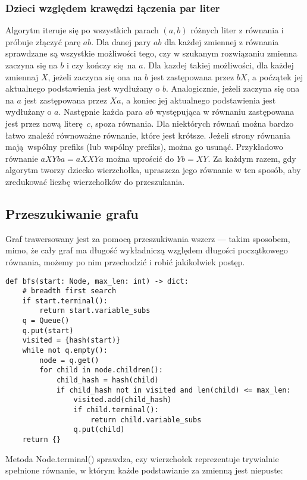 \documentclass[leqno, 12pt]{article}
\begin{document}
\subsubsection*{Dzieci względem krawędzi łączenia par liter}
Algorytm iteruje się po wszystkich parach $(a, b)$ różnych liter z równania i próbuje złączyć parę $ab$.
Dla danej pary $ab$ dla każdej zmiennej z równania sprawdzane są wszystkie możliwości tego, czy w szukanym rozwiązaniu zmienna zaczyna się na $b$ i czy kończy się na $a$. Dla kazdej takiej możliwości, dla każdej zmiennaj $X$, jeżeli zaczyna się ona na $b$ jest zastępowana przez $bX$, a poćzątek jej aktualnego podstawienia jest wydłużany o $b$. Analogicznie, jeżeli zaczyna się ona na $a$ jest zastępowana przez $Xa$, a koniec jej aktualnego podstawienia jest wydłużany o $a$. Następnie każda para $ab$ występująca w równaniu zastępowana jest przez nową literę $c$, spoza równania.
\newline\newline
Dla niektórych równań można bardzo łatwo znaleźć równoważne równanie, które jest krótsze. Jeżeli strony równania mają wspólny prefiks (lub wspólny prefiks), można go usunąć. Przykładowo równanie $aXYba = aXXYa$ można uprościć do $Yb = XY$. Za każdym razem, gdy algorytm tworzy dziecko wierzchołka, upraszcza jego równanie w ten sposób, aby zredukować liczbę wierzchołków do przeszukania.

\subsection{Przeszukiwanie grafu}
Graf trawersowany jest za pomocą przeszukiwania wszerz --- takim sposobem, mimo, że cały graf ma długość wykładniczą względem długości początkowego równania, możemy po nim przechodzić i robić jakikolwiek postęp.

\begin{verbatim}
def bfs(start: Node, max_len: int) -> dict:
    # breadth first search
    if start.terminal():
        return start.variable_subs
    q = Queue()
    q.put(start)
    visited = {hash(start)}
    while not q.empty():
        node = q.get()
        for child in node.children():
            child_hash = hash(child)
            if child_hash not in visited and len(child) <= max_len:
                visited.add(child_hash)
                if child.terminal():
                    return child.variable_subs
                q.put(child)
    return {}
\end{verbatim}

Metoda Node.terminal() sprawdza, czy wierzchołek reprezentuje trywialnie spełnione równanie, w którym każde podstawianie za zmienną jest niepuste:
\end{document}
